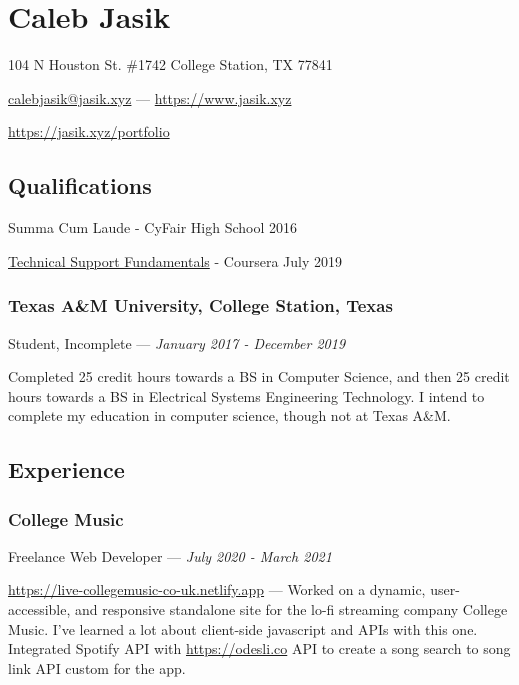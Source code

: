 \documentclass[letterpaper,10pt]{article}
\begin{document}
    \section{\Huge Caleb Jasik}\label{sec:hugecaleb-jasik}

    \hfill 104 N Houston St. \#1742 College Station, TX 77841

    \hfill \href{mailto:calebjasik@jasik.xyz}{calebjasik@jasik.xyz} ---
    \href{https://jasik.xyz}{https://www.jasik.xyz}
    
    \hfill \href{https://jasik.xyz/portfolio}{https://jasik.xyz/portfolio}

    \subsection{Qualifications}\label{subsec:qualifications}

    Summa Cum Laude - CyFair High School 2016

    \href{https://www.coursera.org/account/accomplishments/verify/GZEYJ5VA2YGH}{Technical Support Fundamentals} - Coursera July 2019

    \subsubsection{Texas A\&M University, College Station, Texas}
    \hfill Student, Incomplete --- \emph{January 2017 - December 2019}

    Completed 25 credit hours towards a BS in Computer Science, and then 25 credit hours towards a BS in Electrical Systems Engineering Technology. I intend to complete my education in computer science, though not at Texas A\&M.

    \subsection{Experience}\label{subsec:experience}

    \subsubsection{College Music}
    \hfill Freelance Web Developer --- \emph{July 2020 - March 2021}

    \href{https://live-collegemusic-co-uk.netlify.app}{https://live-collegemusic-co-uk.netlify.app} --- Worked on a dynamic, user-accessible, and responsive standalone site for the lo-fi streaming company College Music. I've learned a lot about client-side javascript and APIs with this one. Integrated Spotify API with \href{https://odesli.co}{https://odesli.co} API to create a song search to song link API custom for the app.
\end{document}
